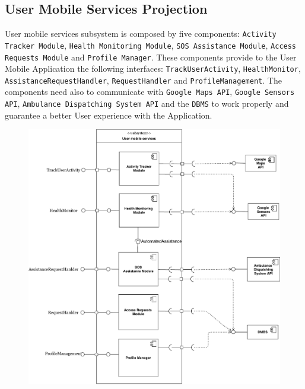 \documentclass[12pt,a4paper]{article}
\begin{document}
	\newpage
	\subsection{User Mobile Services Projection}
	User mobile services subsystem is composed by five components: \texttt{Activity Tracker Module}, \texttt{Health Monitoring Module}, \texttt{SOS Assistance Module}, \texttt{Access Requests Module} and \texttt{Profile Manager}. These components provide to the User Mobile Application the following interfaces: \texttt{TrackUserActivity}, \texttt{HealthMonitor}, \texttt{AssistanceRequestHandler}, \texttt{RequestHandler} and \texttt{ProfileManagement}. The components need also to communicate with \texttt{Google Maps API}, \texttt{Google Sensors API}, \texttt{Ambulance Dispatching System API} and the \texttt{DBMS} to work properly and guarantee a better User experience with the Application. 
	\begin{figure}[H]
		\centering
		\includegraphics[height=1.0\linewidth]{images/user_projection}
		\label{fig:userprojection}
	\end{figure}
	
	\newpage
\end{document}
